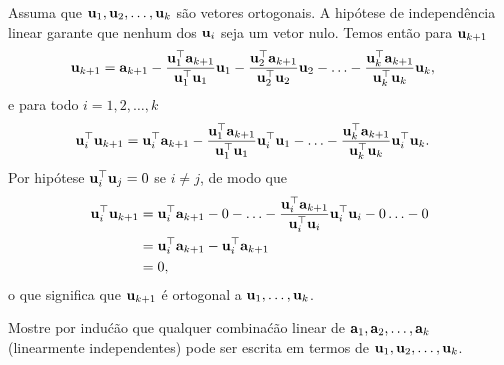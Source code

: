 \begin{exenumerate}
\begin{solution}
        Assuma que $\mathbf{u}_1, \mathbf{u}_2, \ldots, \mathbf{u}_k$ s\~ao vetores ortogonais. A hip\'otese de independ\^encia linear garante que nenhum dos
        $\mathbf{u}_i$ seja um vetor nulo. Temos ent\~ao para $\mathbf{u}_{k+1}$
        \begin{align}
            \mathbf{u}_{k+1} &= \mathbf{a}_{k+1} - \frac{\mathbf{u}_1^\top\mathbf{a}_{k+1}}{\mathbf{u}_1^\top\mathbf{u}_1}\mathbf{u}_1 - \frac{\mathbf{u}_2^\top\mathbf{a}_{k+1}}{\mathbf{u}_2^\top\mathbf{u}_2}\mathbf{u}_2
            - \ldots - \frac{\mathbf{u}_k^\top\mathbf{a}_{k+1}}{\mathbf{u}_k^\top\mathbf{u}_k}\mathbf{u}_k,
            \label{eq:u_k+1}
        \end{align}
        e para todo $i = 1, 2, \ldots, k$
        \begin{align}
            \mathbf{u}_i^\top\mathbf{u}_{k+1} &= \mathbf{u}_i^\top\mathbf{a}_{k+1} - \frac{\mathbf{u}_1^\top\mathbf{a}_{k+1}}{\mathbf{u}_1^\top\mathbf{u}_1}\mathbf{u}_i^\top\mathbf{u}_1 - 
            \ldots - \frac{\mathbf{u}_k^\top\mathbf{a}_{k+1}}{\mathbf{u}_k^\top\mathbf{u}_k}\mathbf{u}_i^\top\mathbf{u}_k.
        \end{align}
        Por hip\'otese $\mathbf{u}_i^\top\mathbf{u}_j = 0$ se $i \neq j$, de modo que
        \begin{align}
            \mathbf{u}_i^\top\mathbf{u}_{k+1} &= \mathbf{u}_i^\top\mathbf{a}_{k+1} - 0 - \ldots - \frac{\mathbf{u}_i^\top\mathbf{a}_{k+1}}{\mathbf{u}_i^\top\mathbf{u}_i}\mathbf{u}_i^\top\mathbf{u}_i - 0 \ldots - 0 \\
            &= \mathbf{u}_i^\top\mathbf{a}_{k+1} - \mathbf{u}_i^\top\mathbf{a}_{k+1} \\
            &= 0,
        \end{align}
        o que significa que $\mathbf{u}_{k+1}$ \'e ortogonal a $\mathbf{u}_1, \ldots, \mathbf{u}_k$.
        
    \end{solution}
    
    \item Mostre por indu\'c\~ao que qualquer combina\'c\~ao linear de $\mathbf{a}_1, \mathbf{a}_2, \ldots, \mathbf{a}_k$ (linearmente independentes)
    pode ser escrita em termos de $\mathbf{u}_1, \mathbf{u}_2, \ldots, \mathbf{u}_k$.
    

\end{exenumerate}
